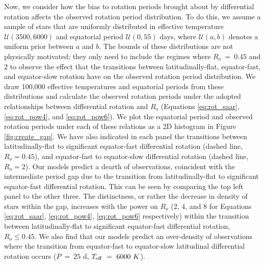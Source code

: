Now, we consider how the bias to rotation periods brought about by differential rotation affects the observed rotation period distribution.
To do this, we assume a sample of stars that are uniformly distributed in effective temperature $\mathcal{U}\left(3500,6000\right)$ and equatorial period $\mathcal{U}\left(0,55\right)$ days, where $\mathcal{U}\left(a,b\right)$ denotes a uniform prior between $a$ and $b$.
The bounds of these distributions are not physically motivated; they only need to include the regimes where $R_o \ = \ 0.45$ and $2$ to observe the effect that the transitions between latitudinally-flat, equator-fast, and equator-slow rotation have on the observed rotation period distribution.
We draw 100,000 effective temperatures and equatorial periods from these distributions and calculate the observed rotation periods under the adopted relationships between differential rotation and $R_o$ (Equations \ref{eq:rot_saar}, \ref{eq:rot_pow4}, and \ref{eq:rot_pow6}).
We plot the equatorial period and observed rotation periods under each of these relations as a 2D histogram in Figure \ref{fig:create_gap}.
We have also indicated in each panel the transitions between latitudinally-flat to significant equator-fast differential rotation (dashed line, $R_o = 0.45$), and equator-fast to equator-slow differential rotation (dashed line, $R_o = 2$).
Our models predict a dearth of observations, coincident with the intermediate period gap due to the transition from latitudinally-flat to significant equator-fast differential rotation.
This can be seen by comparing the top left panel to the other three.
The distinctness, or rather the decrease in density of stars within the gap, increases with the power on $R_o$ (2, 4, and 8 for Equations \ref{eq:rot_saar}, \ref{eq:rot_pow4}, \ref{eq:rot_pow6} respectively) within the transition between latitudinally-flat to significant equator-fast differential rotation, $R_o \leq 0.45$.
We also find that our models predict an over-density of observations where the transition from equator-fast to equator-slow latitudinal differential rotation occurs ($P \ = \ 25$ d, $T_{\rm{eff}} \ = \ 6000 \ K$).

